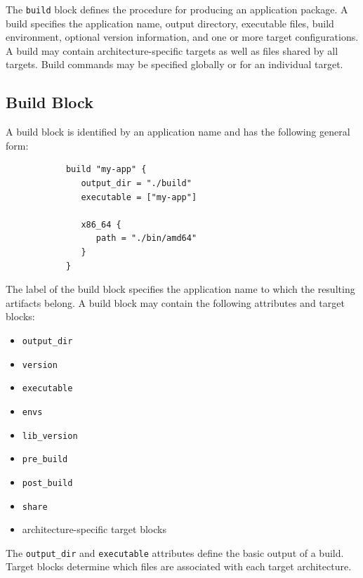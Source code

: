 \documentclass[11pt,a4paper]{article}
\begin{document}
    The \texttt{build} block defines the procedure for producing an application package.
    A build specifies the application name, output directory, executable files, build environment,
    optional version information, and one or more target configurations.
    A build may contain architecture-specific targets as well as files shared by all targets.
    Build commands may be specified globally or for an individual target.

    \subsection{Build Block}\label{subsec:build-block}

    A build block is identified by an application name and has the following general form:

    \begin{center}
        \begin{verbatim}
            build "my-app" {
               output_dir = "./build"
               executable = ["my-app"]

               x86_64 {
                  path = "./bin/amd64"
               }
            }
        \end{verbatim}
    \end{center}

    The label of the build block specifies the application name to which the resulting artifacts belong.
    A build block may contain the following attributes and target blocks:

    \begin{itemize}
        \item \texttt{output\_dir}
        \item \texttt{version}
        \item \texttt{executable}
        \item \texttt{envs}
        \item \texttt{lib\_version}
        \item \texttt{pre\_build}
        \item \texttt{post\_build}
        \item \texttt{share}
        \item architecture-specific target blocks
    \end{itemize}

    The \texttt{output\_dir} and \texttt{executable} attributes define the basic output of a build.
    Target blocks determine which files are associated with each target architecture.
\end{document}

